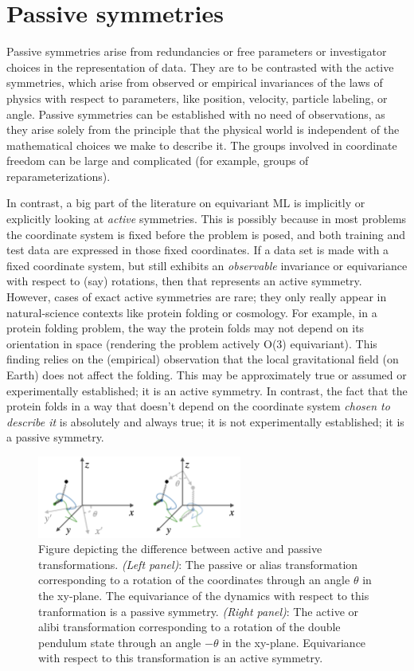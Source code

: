 \documentclass[preprint]{article} %
\begin{document}
\section{Passive symmetries}\label{sec:informal}
Passive symmetries arise from redundancies or free parameters or investigator choices in the representation of data.
They are to be contrasted with the active symmetries, which arise from observed or empirical invariances of the laws of physics with respect to parameters, like position, velocity, particle labeling, or angle.
Passive symmetries can be established with no need of observations, as they arise solely from the principle that the physical world is independent of the mathematical choices we make to describe it.
The groups involved in coordinate freedom can be large and complicated (for example, groups of reparameterizations).

In contrast, a big part of the literature on equivariant ML is implicitly or explicitly looking at \emph{active} symmetries.
This is possibly because in most problems the coordinate system is fixed before the problem is posed, and both training and test data are expressed in those fixed coordinates.
If a data set is made with a fixed coordinate system, but still exhibits an \emph{observable} invariance or equivariance with respect to (say) rotations, then that represents an active symmetry.
However, cases of exact active symmetries are rare; they only really appear in natural-science contexts like protein folding or cosmology.
For example, in a protein folding problem, the way the protein folds may not depend on its orientation in space (rendering the problem actively O(3) equivariant).
This finding relies on the (empirical) observation that the local gravitational field (on Earth) does not affect the folding.
This may be approximately true or assumed or experimentally established; it is an active symmetry.
In contrast, the fact that the protein folds in a way that doesn't depend on the coordinate system \emph{chosen to describe it} is absolutely and always true; it is not experimentally established; it is a passive symmetry.

\begin{figure}
    \centering
    \includegraphics[width=0.6\textwidth]{alias.png}
    \caption{Figure depicting the difference between active and passive transformations. \textsl{(Left panel)}: The passive or alias transformation corresponding to a rotation of the coordinates through an angle $\theta$ in the xy-plane. The equivariance of the dynamics with respect to this tranformation is a passive symmetry. \textsl{(Right panel)}: The active or alibi transformation corresponding to a rotation of the double pendulum state through an angle $-\theta$ in the xy-plane. Equivariance with respect to this transformation is an active symmetry.}
    \label{fig:alias}
\end{figure}
\end{document}
